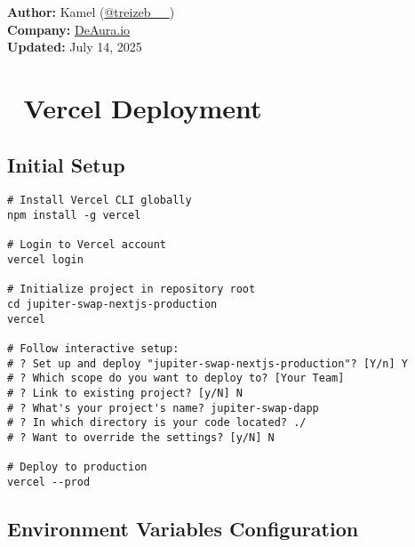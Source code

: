 \documentclass[11pt,a4paper]{article}
\begin{document}
\begin{titlepage}
    \vfill
    
    {\large\textbf{Author:} Kamel (\href{https://x.com/treizeb__}{@treizeb\_\_})\\
    \textbf{Company:} \href{https://deaura.io}{DeAura.io}\\
    \textbf{Updated:} July 14, 2025\par}
\end{titlepage}

\newpage
\tableofcontents
\newpage

\section{🚀 Vercel Deployment}

\subsection{Initial Setup}

\begin{lstlisting}[style=bash, caption=Vercel CLI Installation and Setup]
# Install Vercel CLI globally
npm install -g vercel

# Login to Vercel account
vercel login

# Initialize project in repository root
cd jupiter-swap-nextjs-production
vercel

# Follow interactive setup:
# ? Set up and deploy "jupiter-swap-nextjs-production"? [Y/n] Y
# ? Which scope do you want to deploy to? [Your Team]
# ? Link to existing project? [y/N] N
# ? What's your project's name? jupiter-swap-dapp
# ? In which directory is your code located? ./
# ? Want to override the settings? [y/N] N

# Deploy to production
vercel --prod
\end{lstlisting}

\subsection{Environment Variables Configuration}
\end{document}
